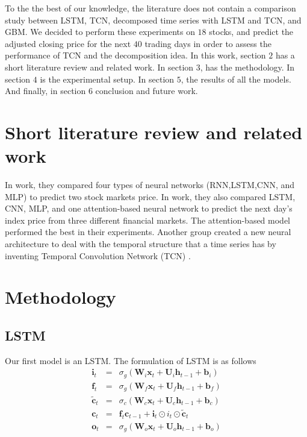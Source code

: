 \documentclass[12pt, A4]{article}
\begin{document}
To the the best of our knowledge, the literature does not contain a comparison study between LSTM, TCN, decomposed time series with LSTM and TCN, and GBM. We decided to perform these experiments on $18$ stocks, and predict the adjusted closing price for the next $40$ trading days in order to assess the performance of TCN and the decomposition idea. In this work, section $2$ has a short literature review and related work. In section $3$, has the methodology. In section $4$ is the experimental setup. In section $5$, the results of all the models. And finally, in section $6$ conclusion and future work.

\section{Short literature review and related work}

In \cite{hiransha2018nse} work, they compared four types of neural networks (RNN,LSTM,CNN, and MLP) to predict two stock markets price. In \cite{gao2020application} work, they also compared LSTM, CNN, MLP, and one attention-based neural network to predict the next day's index price from three different financial markets. The attention-based model performed the best in their experiments. Another group created a new neural architecture to deal with the temporal structure that a time series has by inventing Temporal Convolution Network (TCN)  \cite{lea2017temporal}. 

\section{Methodology}
\subsection{LSTM}
Our first model is an LSTM. The formulation of LSTM is as follows
\begin{eqnarray}
	\mathbf{i}_{t} &=& \sigma_{g}( \mathbf{W}_{i}\mathbf{x}_{t} + \mathbf{U}_{i}\mathbf{h}_{t-1} + \mathbf{b}_{i} ) \\
	\mathbf{f}_{t} &=& \sigma_{g}( \mathbf{W}_{f}\mathbf{x}_{t} + \mathbf{U}_{f}\mathbf{h}_{t-1} + \mathbf{b}_{f}  ) \\
	\tilde{\mathbf{c}}_{t} &=& \sigma_{c}( \mathbf{W}_{c}\mathbf{x}_{t} + \mathbf{U}_{c}\mathbf{h}_{t-1} + \mathbf{b}_{c}  ) \\
	\mathbf{c}_{t} &=& \mathbf{f}_{t}\mathbf{c}_{t-1} + \mathbf{i}_{t} \odot i_{t} \odot 	\tilde{\mathbf{c}}_{t} \\
	\mathbf{o}_{t} &=& \sigma_{g}(\mathbf{W}_{o}\mathbf{x}_{t} + \mathbf{U}_{o}\mathbf{h}_{t-1} + \mathbf{b}_{o} )
\end{eqnarray}
\end{document}
